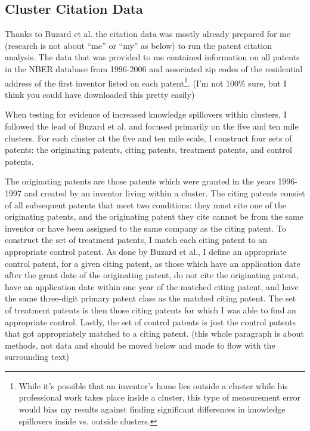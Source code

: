 \documentclass[12pt,letterpaper]{article}
\begin{document}
\subsection{Cluster Citation Data}\label{sec:2.2}
Thanks to Buzard et al. the citation data was mostly already prepared for me {\color{red}(research is not about ``me'' or ``my'' as below)} to run the patent citation analysis. The data that was provided to me contained information on all patents in the NBER database from 1996-2006 and associated zip codes of the residential address of the first inventor listed on each patent\footnote{While it’s possible that an inventor’s home lies outside a cluster while his professional work takes place inside a cluster, this type of measurement error would bias my results against finding significant differences in knowledge spillovers inside vs. outside clusters.}. {\color{red}(I'm not 100\% sure, but I think you could have downloaded this pretty easily)}
\par
When testing for evidence of increased knowledge spillovers within clusters, I followed the lead of Buzard et al. and focused primarily on the five and ten mile clusters. For each cluster at the five and ten mile scale, I construct four sets of patents: the originating patents, citing patents, treatment patents, and control patents. 
\par
The originating patents are those patents which were granted in the years 1996-1997 and created by an inventor living within a cluster. The citing patents consist of all subsequent patents that meet two conditions: they must cite one of the originating patents, and the originating patent they cite cannot be from the same inventor or have been assigned to the same company as the citing patent. To construct the set of treatment patents, I match each citing patent to an appropriate control patent. As done by Buzard et al., I define an appropriate control patent, for a given citing patent, as those which have an application date after the grant date of the originating patent, do not cite the originating patent, have an application date within one year of the matched citing patent, and have the same three-digit primary patent class as the matched citing patent. The set of treatment patents is then those citing patents for which I was able to find an appropriate control. Lastly, the set of control patents is just the control patents that got appropriately matched to a citing patent. {\color{red}(this whole paragraph is about methods, not data and should be moved below and made to flow with the surrounding text)}
\end{document}
